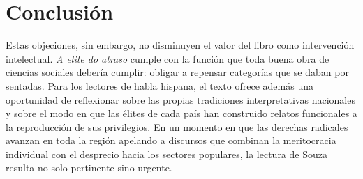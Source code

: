 \section{Conclusión}
Estas objeciones, sin embargo, no disminuyen el valor del libro como intervención intelectual. \textit{A elite do atraso} cumple con la función que toda buena obra de ciencias sociales debería cumplir: obligar a repensar categorías que se daban por sentadas. Para los lectores de habla hispana, el texto ofrece además una oportunidad de reflexionar sobre las propias tradiciones interpretativas nacionales y sobre el modo en que las élites de cada país han construido relatos funcionales a la reproducción de sus privilegios. En un momento en que las derechas radicales avanzan en toda la región apelando a discursos que combinan la meritocracia individual con el desprecio hacia los sectores populares, la lectura de Souza resulta no solo pertinente sino urgente.


